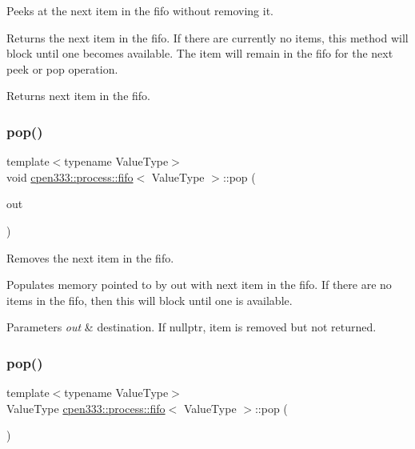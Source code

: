 Peeks at the next item in the fifo without removing it. 

Returns the next item in the fifo. If there are currently no items, this method will block until one becomes available. The item will remain in the fifo for the next {\ttfamily peek} or {\ttfamily pop} operation.

\begin{DoxyReturn}{Returns}
next item in the fifo. 
\end{DoxyReturn}
\mbox{\label{classcpen333_1_1process_1_1fifo_af29e5bd6d8b0fe551c4d7532ffcb331e}} 
\subsubsection{\texorpdfstring{pop()}{pop()}\hspace{0.1cm}{\footnotesize\ttfamily [1/2]}}
{\footnotesize\ttfamily template$<$typename Value\+Type$>$ \\
void \hyperlink{classcpen333_1_1process_1_1fifo}{cpen333\+::process\+::fifo}$<$ Value\+Type $>$\+::pop (\begin{DoxyParamCaption}\item[{Value\+Type $\ast$}]{out }\end{DoxyParamCaption})\hspace{0.3cm}{\ttfamily [inline]}}



Removes the next item in the fifo. 

Populates memory pointed to by {\ttfamily out} with next item in the fifo. If there are no items in the fifo, then this will block until one is available.


\begin{DoxyParams}{Parameters}
{\em out} & destination. If {\ttfamily nullptr}, item is removed but not returned. \\
\hline
\end{DoxyParams}
\mbox{\label{classcpen333_1_1process_1_1fifo_a40796c0eb39299ff4f8c49a789268386}} 
\subsubsection{\texorpdfstring{pop()}{pop()}\hspace{0.1cm}{\footnotesize\ttfamily [2/2]}}
{\footnotesize\ttfamily template$<$typename Value\+Type$>$ \\
Value\+Type \hyperlink{classcpen333_1_1process_1_1fifo}{cpen333\+::process\+::fifo}$<$ Value\+Type $>$\+::pop (\begin{DoxyParamCaption}{ }\end{DoxyParamCaption})\hspace{0.3cm}{\ttfamily [inline]}}




